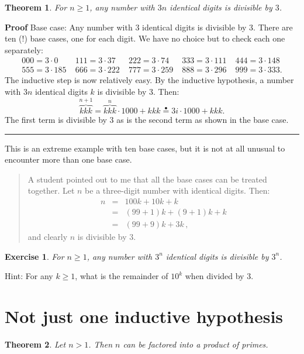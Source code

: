 \documentclass[11pt,a4paper]{report}
\newcommand*{\ih}{\stackrel{\bullet}{=}}
\newcommand*{\qed}{\hfill\rule{1ex}{1.5ex}}
\newtheorem{theorem}{Theorem}
\newtheorem{exercise}{Exercise}
\begin{document}
\begin{theorem}\label{th.three}
For $n\geq 1$, any number with $3n$ identical digits is divisible by $3$.
\end{theorem}

\textbf{Proof} Base case: Any number with $3$ identical digits is divisible by $3$. There are ten (!) base cases, one for each digit. We have no choice but to check each one separately:
\[
\begin{array}{lllll}
000=3\cdot 0 & \;111 = 3\cdot 37 & \;222 = 3\cdot 74 &
\;333=3\cdot 111 & \;444=3\cdot 148\\
555=3\cdot 185 & \;666=3\cdot 222 & \;777=3\cdot 259 &
\;888=3\cdot 296 & \;999=3\cdot 333.
\end{array}
\]
The inductive step is now relatively easy. By the inductive hypothesis, a number with $3n$ identical digits $k$ is divisible by $3$. Then:
\[
\overbrace{kkk}^{n+1} = \overbrace{kkk}^{n}\cdot 1000 + kkk \ih{}
3i\cdot 1000 + kkk.
\]
The first term is divisible by $3$ as is the second term as shown in the base case.\qed

This is an extreme example with ten base cases, but it is not at all unusual to encounter more than one base case.

\begin{quote}
A student pointed out to me that all the base cases can be treated together. Let $n$ be a three-digit number with identical digits. Then:
\begin{eqnarray*}
n &=& 100k + 10k +k\\
&=& (99+1)k + (9+1)k + k\\
&=& (99+9)k + 3k\,,
\end{eqnarray*}
and clearly $n$ is divisible by $3$.
\end{quote}

\begin{exercise}
For $n\geq 1$, any number with $3^n$ identical digits is divisible by $3^n$.
\end{exercise}

Hint: For any $k\geq 1$, what is the remainder of $10^k$ when divided by $3$.

\section{Not just one inductive hypothesis}

\begin{theorem}\label{t.prime}
Let $n>1$. Then $n$ can be factored into a product of primes.
\end{theorem}
\end{document}
